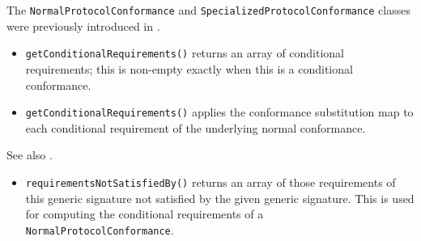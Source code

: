 \documentclass[../generics]{subfiles}
\begin{document}
The \verb|NormalProtocolConformance| and \verb|SpecializedProtocolConformance| classes were previously introduced in .
\begin{itemize}
\item \texttt{getConditionalRequirements()} returns an array of conditional requirements; this is non-empty exactly when this is a conditional conformance.
\end{itemize}
\begin{itemize}
\item \texttt{getConditionalRequirements()} applies the conformance substitution map to each conditional requirement of the underlying normal conformance.
\end{itemize}
See also .
\begin{itemize}
\item \texttt{requirementsNotSatisfiedBy()} returns an array of those requirements of this generic signature not satisfied by the given generic signature. This is used for computing the conditional requirements of a \texttt{NormalProtocolConformance}.
\end{itemize}
\end{document}
